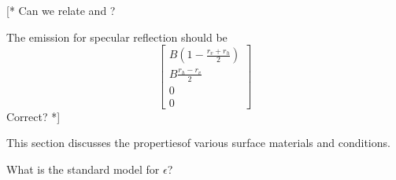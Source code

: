  [* Can we relate  and
 ? 

 The emission for specular reflection should be 
 \begin{equation}
    \left[\begin{array}{c}
      B\left(1-\frac{r_v+r_h}{2}\right) \\
      B\frac{r_h-r_v}{2} \\
      0\\0
    \end{array}\right]
 \end{equation}
 Correct? *]

 
 \label{sec:rte:surfprop}
 
 This section discusses the propertiesof various surface materials and
 conditions.
 
 \label{sec:rte:surfprop:water}

 What is the standard model for $\epsilon$?

 



